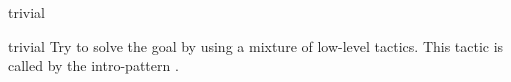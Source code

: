 \begin{tactic}{trivial}
  \begin{tsyntax}[empty]{trivial}
  Try to solve the goal by using a mixture of low-level tactics.
  This tactic is called by the intro-pattern \tct{//}.
  \end{tsyntax}
\end{tactic}
